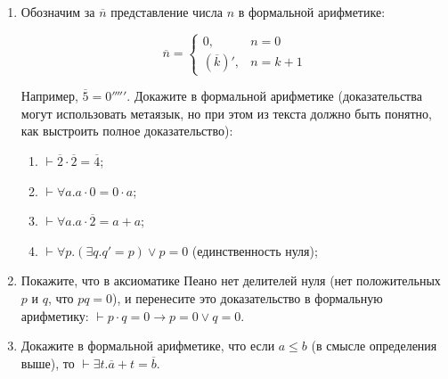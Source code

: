 \documentclass[10pt,a4paper,oneside]{article}
\makeatletter
\newcommand{\dotminus}{\mathbin{\text{\@dotminus}}}
\newcommand{\@dotminus}{%
  \ooalign{\hidewidth\raise1ex\hbox{.}\hidewidth\cr$\m@th-$\cr}%
}
\makeatother
\begin{document}
\begin{enumerate}

\item Обозначим за $\overline{n}$ представление числа $n$ в формальной арифметике: %

$$\overline{n} = \left\{\begin{array}{ll}0, &n = 0\\
           \left(\overline{k}\right)', & n=k+1\end{array}\right.$$

Например, $\overline{5} = 0'''''$. Докажите в формальной арифметике (доказательства могут использовать
метаязык, но при этом из текста должно быть понятно, как выстроить полное доказательство):
\begin{enumerate}
\item $\vdash \overline{2} \cdot \overline{2} = \overline{4}$;
\item $\vdash \forall a.a \cdot 0 = 0 \cdot a$;
\item $\vdash \forall a.a \cdot \overline{2} = a + a$;
\item $\vdash \forall p.(\exists q.q' = p) \vee p = 0$ (единственность нуля);
\end{enumerate}

\item Покажите, что в аксиоматике Пеано нет делителей нуля (нет положительных $p$ и $q$, что $pq = 0$),
и перенесите это доказательство в формальную арифметику: $\vdash p \cdot q = 0 \rightarrow p = 0 \vee q = 0$.

\item Докажите в формальной арифметике, что если $a \le b$ (в смысле определения выше), то $\vdash \exists t . \overline{a} + t = \overline{b}$.


\end{enumerate}
\end{document}
